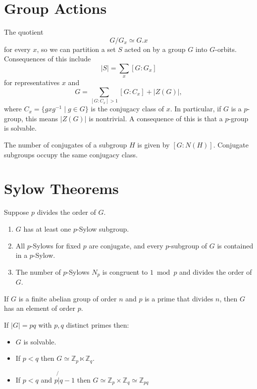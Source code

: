 \documentclass{article}
\begin{document}
\section{Group Actions}
The quotient
$$
G / G_x \simeq G . x
$$
for every $x$, so we can partition a set $S$ acted on by a group $G$
into $G$-orbits. Consequences of this include
$$
|S| = \sum_{x} [G : G_x]
$$
for representatives $x$ and
$$
G = \sum_{[G : C_x] > 1} [G : C_x] + |Z(G)|,
$$
where $C_x = \{gxg^{-1} \mid g \in G\}$ is the conjugacy class of
$x$. In particular, if $G$ is a $p$-group, this means $|Z(G)|$ is
nontrivial. A consequence of this is that a $p$-group is solvable.

The number of conjugates of a subgroup $H$ is given by $[G : N(H)]$.
Conjugate subgroups occupy the same conjugacy class.

\section{Sylow Theorems}
Suppose $p$ divides the order of $G$.
\begin{enumerate}
  \item{
    $G$ has at least one $p$-Sylow subgroup.
  }
  \item{
    All $p$-Sylows for fixed $p$ are conjugate, and every $p$-subgroup
    of $G$ is contained in a $p$-Sylow.
  }
  \item{
    The number of $p$-Sylows $N_p$ is congruent to $1 \bmod p$ and
    divides the order of $G$.
  }
\end{enumerate}

If $G$ is a finite abelian group of order $n$ and $p$ is a prime that
divides $n$, then $G$ has an element of order $p$.

If $|G| = pq$ with $p, q$ distinct primes then:
\begin{itemize}
  \item{
    $G$ is solvable.
  }
  \item{
    If $p < q$ then $G \simeq \mathbb{Z}_p \ltimes \mathbb{Z}_q$.
  }
  \item{
    If $p < q$ and $p \not{\vert} q - 1$ then
    $G \simeq \mathbb{Z}_p \times \mathbb{Z}_q
       \simeq \mathbb{Z}_{pq}$
  }
\end{itemize}
\end{document}

